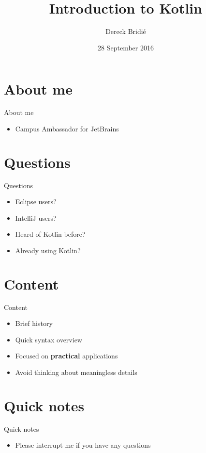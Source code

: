 \documentclass{beamer}
\title{Introduction to Kotlin}
\author{Dereck Bridi\'e}
\date{28 September 2016}
\begin{document}
\begin{frame}
\maketitle
\end{frame}

\section{About me}
\begin{frame}{About me}
\begin{itemize}
    \item Campus Ambassador for JetBrains
\end{itemize}
\end{frame}

\section{Questions}
\begin{frame}{Questions}
\begin{itemize}
    \item Eclipse users?
    \item IntelliJ users?
    \pause
    \item Heard of Kotlin before?
    \item Already using Kotlin?
\end{itemize}
\end{frame}

\section{Content}
\begin{frame}{Content}
\begin{itemize}
    \item Brief history
    \item Quick syntax overview
    \item Focused on \textbf{practical} applications
    \item Avoid thinking about meaningless details
\end{itemize}
\end{frame}

\section{Quick notes}
\begin{frame}{Quick notes}
\begin{itemize}
    \item Please interrupt me if you have any questions
\end{itemize}
\end{frame}
\end{document}
